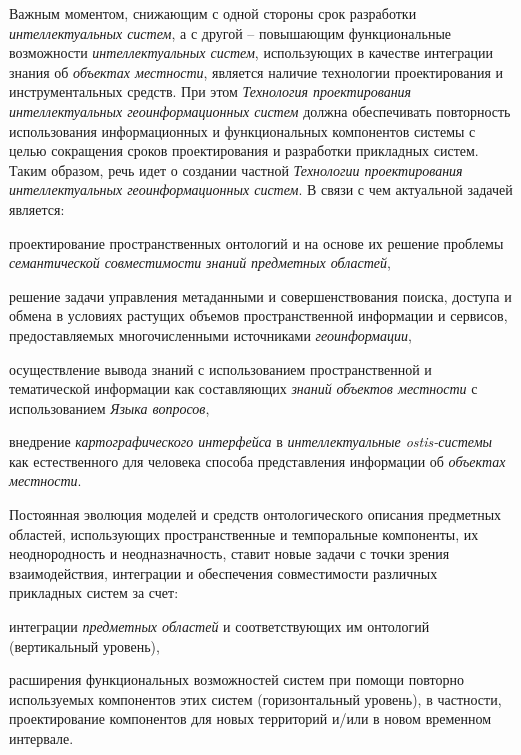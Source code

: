 Важным моментом, снижающим с одной стороны срок разработки \textit{интеллектуальных систем}, а с другой – повышающим функциональные возможности \textit{интеллектуальных систем}, использующих в качестве интеграции знания об \textit{объектах местности}, является наличие технологии проектирования и инструментальных средств. При этом \textit{Технология проектирования интеллектуальных геоинформационных систем} должна обеспечивать повторность использования информационных и функциональных компонентов системы с целью сокращения сроков проектирования и разработки прикладных систем. Таким образом, речь идет о создании частной \textit{Технологии проектирования интеллектуальных геоинформационных систем}. В связи с чем актуальной задачей является: 
\begin{textitemize}
	\item проектирование пространственных онтологий и на основе их решение проблемы \textit{семантической совместимости} \textit{знаний} \textit{предметных областей}, 
	\item решение задачи управления метаданными и совершенствования поиска, доступа и обмена в условиях растущих объемов пространственной информации и сервисов, предоставляемых многочисленными источниками \textit{геоинформации}, 
	\item осуществление вывода знаний с использованием пространственной и тематической информации как составляющих \textit{знаний} \textit{объектов местности} с использованием \textit{Языка вопросов},
	\item внедрение \textit{картографического интерфейса} в \textit{интеллектуальные ostis-системы} как естественного для человека способа представления информации об \textit{объектах местности}.
\end{textitemize}

Постоянная эволюция моделей и средств онтологического описания предметных областей, использующих пространственные и темпоральные компоненты, их неоднородность и неодназначность, ставит новые задачи с точки зрения взаимодействия, интеграции и обеспечения совместимости различных прикладных систем за счет:
\begin{textitemize}
	\item интеграции \textit{предметных областей} и соответствующих им онтологий (вертикальный уровень), 
	\item расширения функциональных возможностей систем при помощи повторно используемых компонентов этих систем (горизонтальный уровень), в частности, проектирование компонентов для новых территорий и/или в новом временном интервале.
\end{textitemize}

